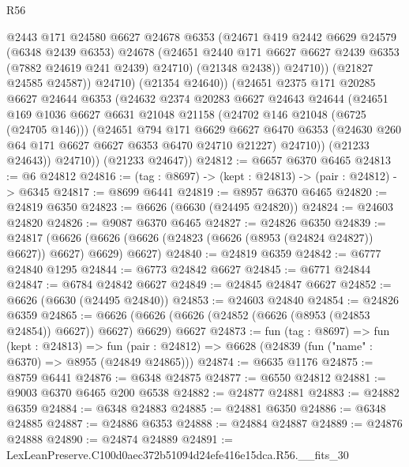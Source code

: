 \begin{lexlean}{R56}
\begin{coremodule}
                  @2443
                  @171
                  @24580
                  @6627
                  @24678
                  @6353
                  (@24671
                    @419
                    @2442
                    @6629
                    @24579
                    (@6348 @2439 @6353)
                    @24678
                    (@24651 @2440 @171 @6627 @6627 @2439 @6353 (@7882 @24619 @241 @2439) @24710)
                    (@21348 @2438))
                  @24710))
              (@21827 @24585 @24587))
            @24710)
          (@21354 @24640))
        (@24651
          @2375
          @171
          @20285
          @6627
          @24644
          @6353
          (@24632
            @2374
            @20283
            @6627
            @24643
            @24644
            (@24651
              @169
              @1036
              @6627
              @6631
              @21048
              @21158
              (@24702 @146 @21048 (@6725 (@24705 @146)))
              (@24651
                @794
                @171
                @6629
                @6627
                @6470
                @6353
                (@24630 @260 @64 @171 @6627 @6627 @6353 @6470 @24710 @21227)
                @24710))
            (@21233 @24643))
          @24710))
      (@21233 @24647))
@24812 := @6657 @6370 @6465
@24813 := @6 @24812
@24816 := (tag : @8697) -> (kept : @24813) -> (pair : @24812) -> @6345
@24817 := @8699 @6441
@24819 := @8957 @6370 @6465
@24820 := @24819 @6350
@24823 := @6626 (@6630 (@24495 @24820))
@24824 := @24603 @24820
@24826 := @9087 @6370 @6465
@24827 := @24826 @6350
@24839 := @24817
    (@6626 (@6626 (@6626 (@24823 (@6626 (@8953 (@24824 @24827)) @6627)) @6627) @6629) @6627)
@24840 := @24819 @6359
@24842 := @6777 @24840 @1295
@24844 := @6773 @24842 @6627
@24845 := @6771 @24844
@24847 := @6784 @24842 @6627
@24849 := @24845 @24847 @6627
@24852 := @6626 (@6630 (@24495 @24840))
@24853 := @24603 @24840
@24854 := @24826 @6359
@24865 := @6626 (@6626 (@6626 (@24852 (@6626 (@8953 (@24853 @24854)) @6627)) @6627) @6629) @6627
@24873 := fun (tag : @8697) =>
  fun (kept : @24813) =>
  fun (pair : @24812) => @6628 (@24839 (fun ("name" : @6370) => @8955 (@24849 @24865)))
@24874 := @6635 @1176
@24875 := @8759 @6441
@24876 := @6348 @24875
@24877 := @6550 @24812
@24881 := @9003 @6370 @6465 @200 @6538
@24882 := @24877 @24881
@24883 := @24882 @6359
@24884 := @6348 @24883
@24885 := @24881 @6350
@24886 := @6348 @24885
@24887 := @24886 @6353
@24888 := @24884 @24887
@24889 := @24876 @24888
@24890 := @24874 @24889
@24891 := LexLeanPreserve.C100d0aec372b51094d24efe416e15dca.R56.__fits_30

\end{coremodule}
\end{lexlean}
